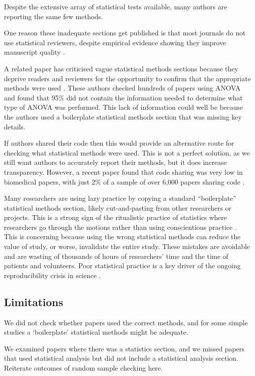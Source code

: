 \documentclass[12pt]{article}
\begin{document}
Despite the extensive array of statistical tests available, many authors
are reporting the same few methods.

One reason these inadequate sections get published is that most journals
do not use statistical reviewers, despite empirical evidence showing
they improve manuscript quality \citep{Hardwicke2020}.

A related paper has criticised vague statistical methods sections
because they deprive readers and reviewers for the opportunity to
confirm that the appropriate methods were used \citep{Weissgerber2018}.
These authors checked hundreds of papers using ANOVA and found that 95\%
did not contain the information needed to determine what type of ANOVA
was performed. This lack of information could well be because the
authors used a boilerplate statistical methods section that was missing
key details.

If authors shared their code then this would provide an alternative
route for checking what statistical methods were used. This is not a
perfect solution, as we still want authors to accurately report their
methods, but it does increase transparency. However, a recent paper
found that code sharing was very low in biomedical papers, with just 2\%
of a sample of over 6,000 papers sharing code \citep{Serghiou2021}.

Many researchers are using lazy practice by copying a standard
``boilerplate'' statistical methods section, likely cut-and-pasting from
other researchers or projects. This is a strong sign of the ritualistic
practice of statistics where researchers go through the motions rather
than using conscientious practice \citep{Stark2018}. This is concerning
because using the wrong statistical methods can reduce the value of
study, or worse, invalidate the entire study. These mistakes are
avoidable and are wasting of thousands of hours of researchers' time and
the time of patients and volunteers. Poor statistical practice is a key
driver of the ongoing reproducibility crisis in science
\citep{Ioannidis2014}.

\hypertarget{limitations}{%
\subsection{Limitations}\label{limitations}}

We did not check whether papers used the correct methods, and for some
simple studies a `boilerplate' statistical methods might be adequate.

We examined papers where there was a statistics section, and we missed
papers that used statistical analysis but did not include a statistical
analysis section. Reiterate outcomes of random sample checking here.
\end{document}
